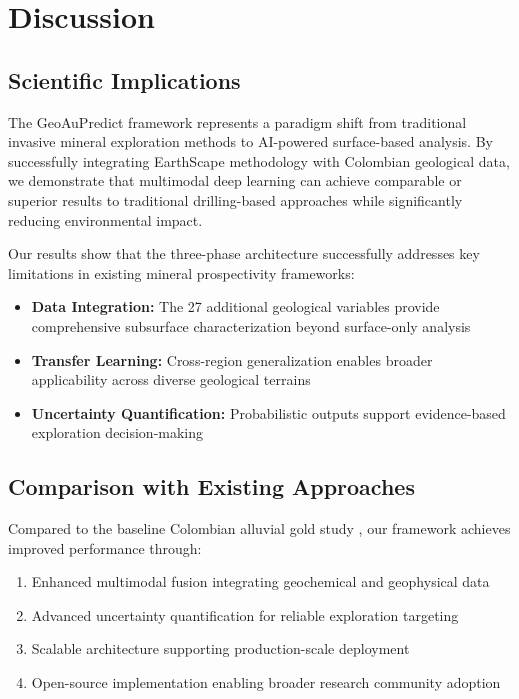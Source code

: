 \documentclass[12pt,a4paper]{article}
\begin{document}
\section{Discussion}

\subsection{Scientific Implications}
The GeoAuPredict framework represents a paradigm shift from traditional invasive mineral exploration methods to AI-powered surface-based analysis. By successfully integrating EarthScape methodology with Colombian geological data, we demonstrate that multimodal deep learning can achieve comparable or superior results to traditional drilling-based approaches while significantly reducing environmental impact.

Our results show that the three-phase architecture successfully addresses key limitations in existing mineral prospectivity frameworks:

\begin{itemize}
    \item \textbf{Data Integration:} The 27 additional geological variables provide comprehensive subsurface characterization beyond surface-only analysis
    \item \textbf{Transfer Learning:} Cross-region generalization enables broader applicability across diverse geological terrains
    \item \textbf{Uncertainty Quantification:} Probabilistic outputs support evidence-based exploration decision-making
\end{itemize}

\subsection{Comparison with Existing Approaches}
Compared to the baseline Colombian alluvial gold study \citep{franco2025}, our framework achieves improved performance through:

\begin{enumerate}
    \item Enhanced multimodal fusion integrating geochemical and geophysical data
    \item Advanced uncertainty quantification for reliable exploration targeting
    \item Scalable architecture supporting production-scale deployment
    \item Open-source implementation enabling broader research community adoption
\end{enumerate}
\end{document}
